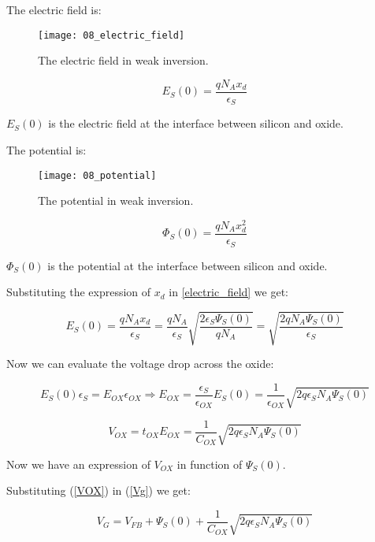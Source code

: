 \documentclass[a4paper, 12pt, twoside, openright]{report}
\begin{document}
The electric field is:

	\begin{figure}[H]
	\centering
	\texttt{[image: 08\_electric\_field]}
	\caption{The electric field in weak inversion.}
	\label{}
	\end{figure}

\begin{equation}
E_S(0) = \frac{qN_Ax_d}{\epsilon_S}
\label{electric_field}
\end{equation}

$E_{S}(0)$ is the electric field at the interface between silicon and oxide.

The potential is:

	\begin{figure}[H]
	\centering
	\texttt{[image: 08\_potential]}
	\caption{The potential in weak inversion.}
	\label{}
	\end{figure}

\begin{equation}
\Phi_S(0) = \frac{qN_Ax_d^2}{\epsilon_S}
\label{}
\end{equation}

$\Phi_S(0)$ is the potential at the interface between silicon and oxide.

Substituting the expression of $x_{d}$ in \ref{electric_field} we get:

\begin{equation}
E_S(0) = \frac{qN_Ax_d}{\epsilon_S} = \frac{qN_A}{\epsilon_S} \sqrt{\frac{2\epsilon_S\Psi_S(0)}{qN_A}} = \sqrt{\frac{2 qN_A \Psi_S(0)}{\epsilon_S}}
\label{}
\end{equation}

Now we can evaluate the voltage drop across the oxide:

\begin{equation}
E_S(0) \epsilon_S = E_{OX} \epsilon_{OX} \Rightarrow E_{OX} = \frac{\epsilon_S}{\epsilon_{OX}}E_S(0) = \frac{1}{\epsilon_{OX}} \sqrt{2q \epsilon_S N_A \Psi_S(0)}
\label{}
\end{equation}

\begin{equation}
V_{OX} = t_{OX} E_{OX} = \frac{1}{C_{OX}} \sqrt{2q \epsilon_S N_A \Psi_S(0)}
\label{VOX}
\end{equation}

Now we have an expression of $V_{OX}$ in function of $\Psi_S(0)$.

Substituting (\ref{VOX}) in (\ref{Vg}) we get:

\begin{equation}
V_G = V_{FB} + \Psi_S(0) + \frac{1}{C_{OX}} \sqrt{2q \epsilon_S N_A \Psi_S(0)}
\label{}
\end{equation}
\end{document}
